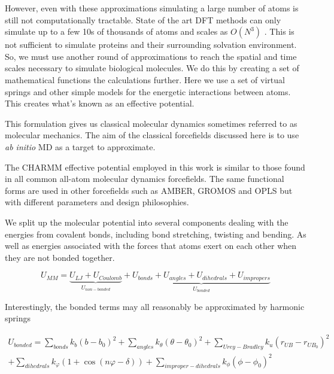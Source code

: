 However, even with these approximations simulating a large number of atoms is still not computationally tractable. State of the art DFT methods can only simulate up to a few 10s of thousands of atoms \cite{luo2020} and scales as $O(N^3)$ \cite{kresse1996}. This is not sufficient to simulate proteins and their surrounding solvation environment. So, we must use another round of approximations to reach the spatial and time scales necessary to simulate biological molecules. We do this by creating a set of mathematical functions the calculations further. Here we use a set of virtual springs and other simple models for the energetic interactions between atoms. This creates what's known as an effective potential. 

This formulation gives us classical molecular dynamics sometimes referred to as molecular mechanics. The aim of the classical forcefields discussed here is to use \textit {ab initio} MD as a target to approximate. 

The CHARMM effective potential employed in this work is similar to those found in all common all-atom molecular dynamics forcefields. The same  functional forms are used in other forcefields such as AMBER, GROMOS and OPLS but with different parameters and design philosophies\cite{lemkul2020}. 

We split up the molecular potential into several components dealing with the energies from covalent bonds, including bond stretching, twisting and bending. As well as energies associated with the forces that atoms exert on each other when they are not bonded together. 

\begin{equation}
	U_{MM} = \underbrace{U_{LJ} + U_{Coulomb}}_{U_{non-bonded}} + \underbrace{U_{bonds} + U_{angles} + U_{dihedrals} + U_{impropers}}_{U_{bonded} }
	\label{CHARMM_effective_potential_eq}
\end{equation}

Interestingly, the bonded terms may all reasonably be approximated by harmonic springs

\begin{equation}\label{bonded_eqs}
	\begin{aligned}
	U_{bonded} = \sum_{bonds} k_{b} (b-b_0)^2 + \sum_{angles} k_\theta(\theta-\theta_0)^2+ \sum_{Urey-Bradley} k_u(r_{UB}-r_{UB_0})^2   \\ + \sum_{dihedrals} k_\varphi (1+\cos(n \varphi - \delta)) + \sum_{improper-dihedrals}  k_{\phi} (\phi - \phi_0)^2 
\end{aligned}
\end{equation}

